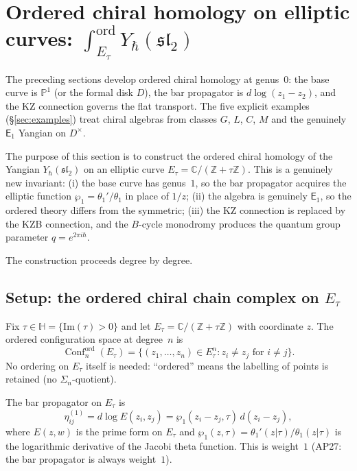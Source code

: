 \documentclass[11pt,reqno]{amsart}
\theoremstyle{definition}
\theoremstyle{remark}
\newcommand{\Eone}{\mathsf{E}_{1}}
\DeclareMathOperator{\Conf}{Conf}
\newcommand{\CC}{\mathbb{C}}
\newcommand{\ZZ}{\mathbb{Z}}
\newcommand{\PP}{\mathbb{P}}
\newcommand{\HHH}{\mathbb{H}}
\numberwithin{equation}{section}
\begin{document}
\section{Ordered chiral homology on elliptic curves:
$\int_{E_\tau}^{\mathrm{ord}} Y_\hbar(\mathfrak{sl}_2)$}
\label{sec:elliptic-ordered}

The preceding sections develop ordered chiral homology at
genus~$0$: the base curve is $\PP^1$ (or the formal disk
$D$), the bar propagator is $d\log(z_1 - z_2)$, and the KZ
connection governs the flat transport. The five
explicit examples (\S\ref{sec:examples}) treat chiral
algebras from classes $G$, $L$, $C$, $M$ and the genuinely
$\Eone$ Yangian on $D^\times$.

The purpose of this section is to construct the ordered
chiral homology of the Yangian
$Y_\hbar(\mathfrak{sl}_2)$ on an elliptic curve
$E_\tau = \CC / (\ZZ + \tau\ZZ)$. This is a genuinely new
invariant: (i) the base curve has genus~$1$, so the bar
propagator acquires the elliptic function
$\wp_1 = \theta_1'/\theta_1$ in place of $1/z$; (ii) the algebra is genuinely $\Eone$,
so the ordered theory differs from the symmetric; (iii)
the KZ connection is replaced by the KZB connection, and
the $B$-cycle monodromy produces the quantum group
parameter $q = e^{2\pi i \hbar}$.

The construction proceeds degree by degree.

\subsection{Setup: the ordered chiral chain complex on
$E_\tau$}
\label{subsec:elliptic-setup}

Fix $\tau \in \HHH = \{\mathrm{Im}(\tau) > 0\}$ and let
$E_\tau = \CC/(\ZZ + \tau\ZZ)$ with coordinate $z$. The
ordered configuration space at degree~$n$ is
\begin{equation}\label{eq:conf-elliptic}
  \Conf_n^{\mathrm{ord}}(E_\tau)
  = \{(z_1, \ldots, z_n) \in E_\tau^n :
  z_i \neq z_j \text{ for } i \neq j\}.
\end{equation}
No ordering on $E_\tau$ itself is needed: ``ordered'' means
the labelling of points is retained (no $\Sigma_n$-quotient).

The bar propagator on $E_\tau$ is
\begin{equation}\label{eq:bar-prop-ell}
  \eta^{(1)}_{ij}
  = d\log E(z_i, z_j)
  = \wp_1(z_i - z_j, \tau)\,d(z_i - z_j),
\end{equation}
where $E(z,w)$ is the prime form on $E_\tau$ and
$\wp_1(z, \tau) = \theta_1'(z|\tau)/\theta_1(z|\tau)$
is the logarithmic derivative of the Jacobi theta function. This is weight~$1$ (AP27: the bar propagator
is always weight~$1$).
\end{document}
